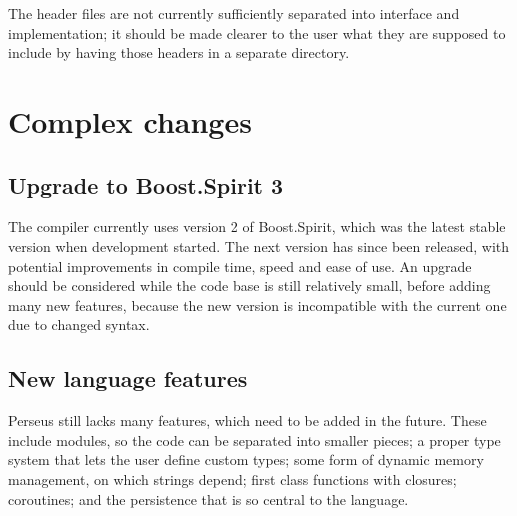 		The header files are not currently sufficiently separated into interface and implementation; it should be made clearer to the user what they are supposed to include by having those headers in a separate directory.
	
	\section{Complex changes}
		
		\subsection{Upgrade to Boost.Spirit 3}
		
		The compiler currently uses version 2 of Boost.Spirit, which was the latest stable version when development started. The next version has since been released, with potential improvements in compile time, speed and ease of use. An upgrade should be considered while the code base is still relatively small, before adding many new features, because the new version is incompatible with the current one due to changed syntax.
		
		\subsection{New language features}
		
		Perseus still lacks many features, which need to be added in the future. These include modules, so the code can be separated into smaller pieces; a proper type system that lets the user define custom types; some form of dynamic memory management, on which strings depend; first class functions with closures; coroutines; and the persistence that is so central to the language.
